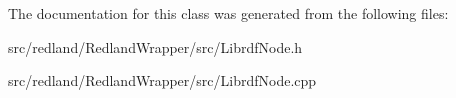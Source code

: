 The documentation for this class was generated from the following files\+:\begin{DoxyCompactItemize}
\item 
src/redland/\+Redland\+Wrapper/src/Librdf\+Node.\+h\item 
src/redland/\+Redland\+Wrapper/src/Librdf\+Node.\+cpp\end{DoxyCompactItemize}
